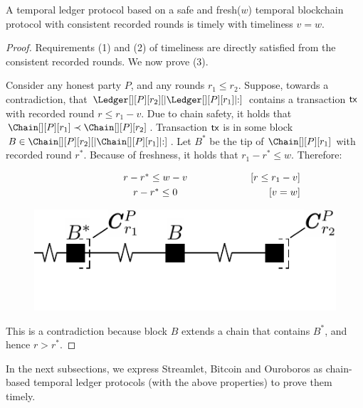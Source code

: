 \begin{theorem} \label{thm:freshness-to-timeliness}
  A temporal ledger protocol based on a safe and fresh($w$)
  temporal blockchain protocol with consistent recorded rounds is timely with timeliness $v = w$.
\end{theorem}
\begin{proof}
  Requirements (1) and (2) of timeliness are directly satisfied from
  the consistent recorded rounds.
  We now prove (3).

  Consider any honest party $P$, and any rounds $r_1 \leq r_2$.
  Suppose, towards a contradiction, that $\Ledger[][P][r_2][|\Ledger[][P][r_1]|{:}]$
  contains a transaction $\textsf{tx}$ with recorded round $r \leq r_1 - v$.
  Due to chain safety, it holds that $\Chain[][P][r_1] \prec \Chain[][P][r_2]$.
  Transaction $\textsf{tx}$ is in some block $B \in \Chain[][P][r_2][|\Chain[][P][r_1]|{:}]$.
  Let $B^*$ be the tip of $\Chain[][P][r_1]$ with recorded round $r^*$.
  Because of freshness, it holds that $r_1 - r^* \leq w$.
  Therefore:

  \begin{align*}
    \makebox[0.5\textwidth][c]{$r - r^* \leq w - v$}         && \text{[$r \leq r_1 - v$]} \\
    \makebox[0.5\textwidth][c]{$r - r^* \leq 0$}             && \text{[$v = w$]}
  \end{align*}

  \begin{figure}
    \centering
    \includegraphics[width=0.5\columnwidth,keepaspectratio]{figures/freshness-timeliness.pdf}
    \caption{
    }
   \label{fig:freshness-to-timeliness}
  \end{figure}

  This is a contradiction because block $B$ extends a chain that contains $B^*$,
  and hence $r > r^*$.
  \Qed
\end{proof}

In the next subsections, we express Streamlet, Bitcoin and Ouroboros
as chain-based temporal ledger protocols (with the above properties) to
prove them timely.
